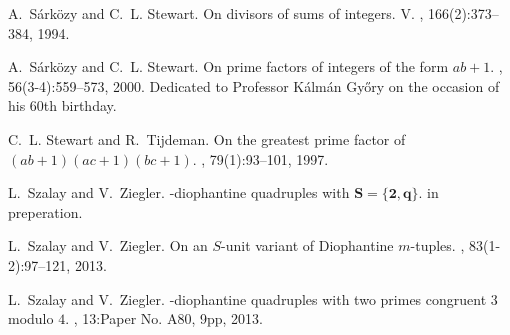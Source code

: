 \documentclass{amsart}
\theoremstyle{remark}
\begin{document}
\begin{thebibliography}{10}
A.~S{\'a}rk{\"o}zy and C.~L. Stewart.
\newblock On divisors of sums of integers. {V}.
, 166(2):373--384, 1994.

A.~S{\'a}rk{\"o}zy and C.~L. Stewart.
\newblock On prime factors of integers of the form {$ab+1$}.
, 56(3-4):559--573, 2000.
\newblock Dedicated to Professor K{\'a}lm{\'a}n Gy{\H{o}}ry on the occasion of
  his 60th birthday.

C.~L. Stewart and R.~Tijdeman.
\newblock On the greatest prime factor of {$(ab+1)(ac+1)(bc+1)$}.
, 79(1):93--101, 1997.

L.~Szalay and V.~Ziegler.
-diophantine quadruples with $\mathbf{S=\{2,q\}}$.
\newblock in preperation.

L.~Szalay and V.~Ziegler.
\newblock On an {$S$}-unit variant of {D}iophantine {$m$}-tuples.
, 83(1-2):97--121, 2013.

L.~Szalay and V.~Ziegler.
-diophantine quadruples with two primes congruent $3$ modulo
  $4$.
, 13:Paper No. A80, 9pp, 2013.

\end{thebibliography}
\end{document}
